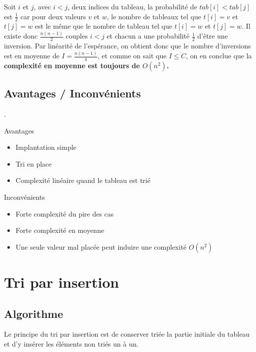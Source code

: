 \documentclass{../cours}
\begin{document}
Soit $i$ et $j$, avec $i < j$, deux indices du tableau, la probabilité de $tab[i] < tab[j]$ est $\frac{1}{2}$ car pour deux valeurs $v$ et $w$, le nombre de tableaux tel que $t[i] = v$ et $t[j] = w$ est le même que le nombre de tableau tel que $t[i] = w$ et $t[j] = w$. Il existe donc $\frac{n(n-1)}{2}$ couples $i < j$ et chacun a une probabilité $\frac{1}{2}$ d'être une inversion. Par linéarité de l'espérance, on obtient donc que le nombre d'inversions est en moyenne de $I = \frac{n(n-1)}{4}$, et comme on sait que $I \leq C$, on en conclue que la \textbf{complexité en moyenne est toujours de $O(n^2)$.}

\subsection{Avantages / Inconvénients}

.

\begin{minipage}[t]{0.49 \textwidth}
Avantages

\begin{itemize}
\item Implantation simple
\item Tri en place 
\item Complexité linéaire quand le tableau est trié
\end{itemize}

\end{minipage}
\begin{minipage}[t]{0.49 \textwidth}
Inconvénients

\begin{itemize}
\item Forte complexité du pire des cas
\item Forte complexité en moyenne
\item Une seule valeur mal placée peut induire une complexité $O(n^2)$
\end{itemize}

\end{minipage}

\section{Tri par insertion}

\subsection{Algorithme}

Le principe du tri par insertion est de conserver triée la partie initiale du tableau et d'y insérer les éléments non triés un à un.
\end{document}
